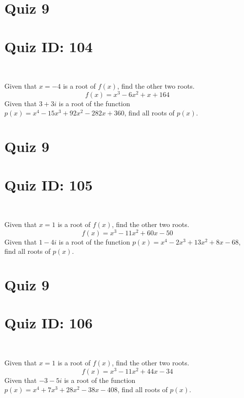 \documentclass{exam}
\begin{document}
\section*{Quiz 9}
\section*{Quiz ID: 104}
\vspace{0.5cm}\
\vspace{1cm}\
\begin{questions}
\question Given that $x=-4$ is a root of $f(x)$, find the other two roots.\[f(x)=
x^3 - 6x^2 + x + 164\]
\newpage
\question Given that $3+3\mathit{i}$ is a root of the function $p(x)=
x^4 - 15x^3 + 92x^2 - 282x + 360$, find all roots of $p(x)$. 
\end{questions}\newpage
\newpage
\section*{Quiz 9}
\section*{Quiz ID: 105}
\vspace{0.5cm}\
\vspace{1cm}\
\begin{questions}
\question Given that $x=1$ is a root of $f(x)$, find the other two roots.\[f(x)=
x^3 - 11x^2 + 60x - 50\]
\newpage
\question Given that $1-4\mathit{i}$ is a root of the function $p(x)=
x^4 - 2x^3 + 13x^2 + 8x - 68$, find all roots of $p(x)$. \makeemptybox{\stretch{1}}
\end{questions}\newpage
\newpage
\section*{Quiz 9}
\section*{Quiz ID: 106}
\vspace{0.5cm}\
\vspace{1cm}\
\begin{questions}
\question Given that $x=1$ is a root of $f(x)$, find the other two roots.\[f(x)=
x^3 - 11x^2 + 44x - 34\]
\newpage
\question Given that $-3-5\mathit{i}$ is a root of the function $p(x)=
x^4 + 7x^3 + 28x^2 - 38x - 408$, find all roots of $p(x)$. \makeemptybox{\stretch{1}}
\end{questions}\newpage
\newpage
\end{document}
